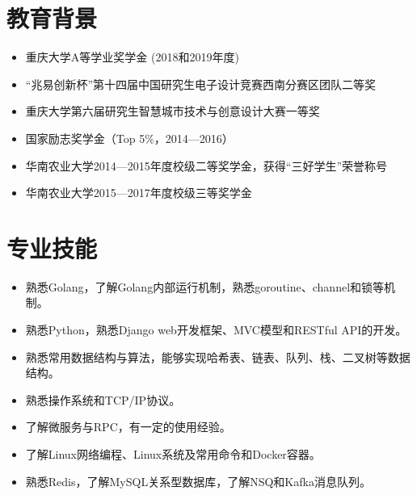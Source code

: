 \documentclass{resume}
\begin{document}




\section{教育背景}
\begin{itemize}
  \item 重庆大学A等学业奖学金 (2018和2019年度)
  \item “兆易创新杯”第十四届中国研究生电子设计竞赛西南分赛区团队二等奖
  \item 重庆大学第六届研究生智慧城市技术与创意设计大赛一等奖
\end{itemize}
\begin{itemize}
  \item 国家励志奖学金（Top 5\%，2014—2016）
  \item 华南农业大学2014—2015年度校级二等奖学金，获得“三好学生”荣誉称号
  \item 华南农业大学2015—2017年度校级三等奖学金
\end{itemize}

\section{专业技能}
\begin{itemize}[parsep=0.2ex]
  \item 熟悉Golang，了解Golang内部运行机制，熟悉goroutine、channel和锁等机制。
  \item 熟悉Python，熟悉Django web开发框架、MVC模型和RESTful API的开发。
  \item 熟悉常用数据结构与算法，能够实现哈希表、链表、队列、栈、二叉树等数据结构。
  \item 熟悉操作系统和TCP/IP协议。
  \item 了解微服务与RPC，有一定的使用经验。
  \item 了解Linux网络编程、Linux系统及常用命令和Docker容器。
  \item 熟悉Redis，了解MySQL关系型数据库，了解NSQ和Kafka消息队列。
\end{itemize}
\end{document}
